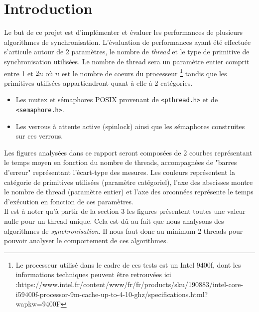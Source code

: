 



\maketitle

\newpage

\section{Introduction}

Le but de ce projet est d'implémenter et évaluer les performances de plusieurs algorithmes de synchronisation.
L'évaluation de performances ayant été effectuée s'articule autour de 2 paramètres, le nombre de \textit{thread} et le type de primitive de synchronisation utilisées.
Le nombre de thread sera un paramètre entier comprit entre 1 et $2n$ où $n$ est le nombre de coeurs du processeur \footnote{Le processeur utilisé dans le cadre de ces tests est un Intel 9400f, dont les informations techniques peuvent être retrouvées ici :https://www.intel.fr/content/www/fr/fr/products/sku/190883/intel-core-i59400f-processor-9m-cache-up-to-4-10-ghz/specifications.html?wapkw=9400F } tandis que les primitives utilisées appartiendront quant à elle à 2 catégories. 
\begin{itemize}
    \item Les mutex et sémaphores POSIX provenant de \texttt{<pthread.h>} et de \texttt{<semaphore.h>}.
    \item Les verrous à attente active (spinlock) ainsi que les sémaphores construites sur ces verrous.
\end{itemize}

\noindent Les figures analysées dans ce rapport seront composées de 2 courbes représentant le temps moyen en fonction du nombre de threads, accompagnées de "barres d'erreur" représentant l'écart-type des mesures.
Les couleurs représentent la catégorie de primitives utilisées (paramètre catégoriel), l'axe des abscisses montre le nombre de thread (paramètre entier) et l'axe des orconnées représente le temps d'exécution en fonction de ces paramètres. \\

\noindent Il est à noter qu'à partir de la section 3 les figures présentent toutes une valeur nulle pour un thread unique. Cela est dû au fait que nous analysons des algorithmes de \textit{synchronisation}.
Il nous faut donc au minimum 2 threads pour pouvoir analyser le comportement de ces algorithmes.


